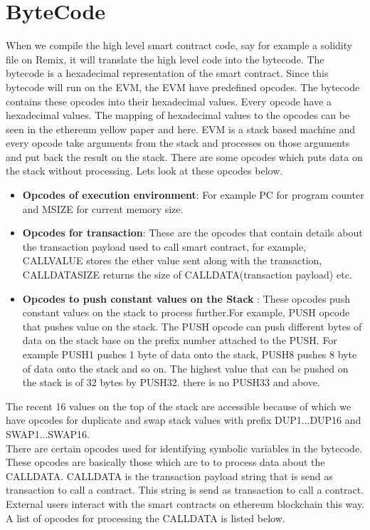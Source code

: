 \section{ByteCode}
When we compile the high level smart contract code, say for example a solidity file on Remix, it will translate the high level code into the bytecode. The bytecode is a hexadecimal representation of the smart contract. Since this bytecode will run on the EVM, the EVM have predefined opcodes. The bytecode contains these opcodes into their hexadecimal values. Every opcode have a hexadecimal values. The mapping of hexadecimal values to the opcodes can be seen in the ethereum yellow paper and here. EVM is a stack based machine and every opcode take arguments from the stack and processes on those arguments and put back the result on the stack. There are some opcodes which puts data on the stack without processing. Lets look at these opcodes below.
\begin{itemize}
    \item \textbf{Opcodes of execution environment}: For example PC for program counter and MSIZE for current memory size.
    \item \textbf{Opcodes for transaction}: These are the opcodes that contain details about the transaction payload used to call smart contract, for example, CALLVALUE stores the ether value sent along with the transaction, CALLDATASIZE returns the size of CALLDATA(transaction payload) etc.
    \item \textbf{Opcodes to push constant values on the Stack} : These opcodes push constant values on the stack to process further.For example, PUSH opcode that pushes value on the stack. The PUSH opcode can push different bytes of data on the stack base on the prefix number attached to the PUSH. For example PUSH1 pushes 1 byte of data onto the stack, PUSH8 pushes 8 byte of data onto the stack and so on. The highest value that can be pushed on the stack is of 32 bytes by PUSH32. there is no PUSH33 and above. 
\end{itemize}
The recent 16 values on the top of the stack are accessible because of which we have opcodes for duplicate and swap stack values with prefix DUP1...DUP16 and SWAP1...SWAP16.\\
There are certain opcodes used for identifying symbolic variables in the bytecode. These opcodes are basically those which are to to process data about the CALLDATA. CALLDATA is the transaction payload string that is send as transaction to call a contract. This string is send as transaction to call a contract. External users interact with the smart contracts on ethereum blockchain this way. A list of opcodes for processing the CALLDATA is listed below.
